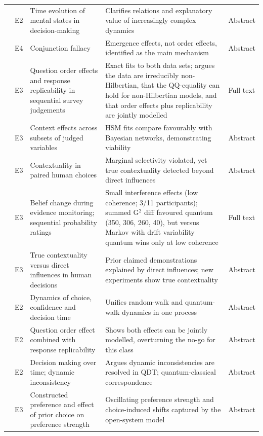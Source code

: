 \documentclass[10pt,a4paper]{article}
\begin{document}
\begin{longtable}{@{}P{3.6cm}P{0.7cm}P{4.6cm}P{6.2cm}P{1.1cm}@{}}
\citet{Broekaert2017} & E2 & Time evolution of mental states in decision-making & Clarifies relations and explanatory value of increasingly complex dynamics & Abstract \\
\citet{Aerts2017} & E4 & Conjunction fallacy & Emergence effects, not order effects, identified as the main mechanism & Abstract \\
\citet{Aerts2017b} & E3 & Question order effects and response replicability in sequential survey judgements & Exact fits to both data sets; argues the data are irreducibly non-Hilbertian, that the QQ-equality can hold for non-Hilbertian models, and that order effects plus replicability are jointly modelled & Full text \\
\citet{Busemeyer2018} & E3 & Context effects across subsets of judged variables & HSM fits compare favourably with Bayesian networks, demonstrating viability & Abstract \\
\citet{Cervantes2018} & E3 & Contextuality in paired human choices & Marginal selectivity violated, yet true contextuality detected beyond direct influences & Abstract \\
\citet{Busemeyer2019} & E3 & Belief change during evidence monitoring; sequential probability ratings & Small interference effects (low coherence; 3/11 participants); summed G$^2$ diff favoured quantum (350, 306, 260, 40), but versus Markov with drift variability quantum wins only at low coherence & Full text \\
\citet{Basieva2019} & E3 & True contextuality versus direct influences in human decisions & Prior claimed demonstrations explained by direct influences; new experiments show true contextuality & Abstract \\
\citet{Busemeyer2020} & E2 & Dynamics of choice, confidence and decision time & Unifies random-walk and quantum-walk dynamics in one process & Abstract \\
\citet{Ozawa2020} & E2 & Question order effect combined with response replicability & Shows both effects can be jointly modelled, overturning the no-go for this class & Abstract \\
\citet{Yukalov2020} & E2 & Decision making over time; dynamic inconsistency & Argues dynamic inconsistencies are resolved in QDT; quantum-classical correspondence & Abstract \\
\citet{Kvam2021} & E3 & Constructed preference and effect of prior choice on preference strength & Oscillating preference strength and choice-induced shifts captured by the open-system model & Abstract \\

\end{longtable}
\end{document}
